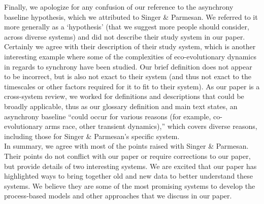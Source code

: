 \documentclass[11pt,letter]{article}
\begin{document}
Finally, we apologize for any confusion of our reference to the asynchrony baseline hypothesis, which we attributed to Singer \& Parmesan. We referred to it more generally as a `hypothesis' (that we suggest more people should consider, across diverse systems) and did not describe their study system in our paper. Certainly we agree with their description of their study system, which is another interesting example where some of the complexities of eco-evolutionary dynamics in regards to synchrony have been studied. Our brief definition does not appear to be incorrect, but is also not exact to their system (and thus not exact to the timescales or other factors required for it to fit to their system).  As our paper is a cross-system review, we worked for definitions and descriptions that could be broadly applicable, thus as our glossary definition and main text states, an asynchrony baseline ``could occur for various reasons (for example, co-evolutionary arms race, other transient dynamics),'' which covers diverse reasons, including those for Singer \& Parmesan's specific system.\\

In summary, we agree with most of the points raised with Singer \& Parmesan. Their points do not conflict with our paper or require corrections to our paper, but provide details of two interesting systems. We are excited that our paper has highlighted ways to bring together old and new data to better understand these systems. We believe they are some of the most promising systems to develop the process-based models and other approaches that we discuss in our paper. 

\begin{footnotesize}

\end{footnotesize}
\end{document}

